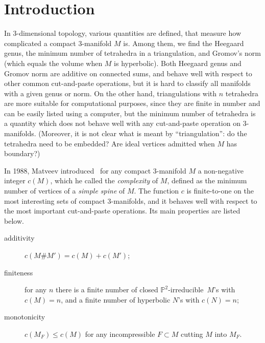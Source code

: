 \documentclass[10pt]{article}      %
\newcommand{\matP} {\ensuremath {\mathbb{P}}}
\newcommand{\ptwoirred}{$\matP^2$-irreducible}
\begin{document}
\renewcommand{\title}{Complexity of $3$-manifolds}
\renewcommand{\author}{Bruno Martelli\footnote{Supported by the INTAS project ``CalcoMet-GT'' 
03-51-3663}}

\dohead


\renewcommand{\firstpage}{\pageref{martelli_first}}  %
\renewcommand{\lastpage}{\pageref{martelli_last}}

\begin{abstract}
We give a summary of known results on Matveev's complexity of compact $3$-manifolds.
The only relevant new result is
the classification of all closed orientable irreducible $3$-manifolds
of complexity $10$.
\end{abstract}

\section{Introduction} \label{martelli_first}  
In 3-dimensional topology, various quantities are defined, that measure how complicated a 
compact 3-manifold $M$ is. 
Among them, we find the Heegaard genus, the minimum number of tetrahedra in a triangulation,
and Gromov's norm (which equals the volume when $M$ is hyperbolic).
Both Heegaard genus and Gromov norm are additive on connected sums, and behave well
with respect to other common cut-and-paste operations,
but it is hard to classify all manifolds with a given genus or norm.
On the other hand, triangulations with $n$ tetrahedra are more suitable for computational
purposes, since they are finite in number
and can be easily listed using a computer, 
but the minimum number of tetrahedra is
a quantity which does not behave well with any cut-and-paste operation on 3-manifolds.
(Moreover, it is not clear what is meant by ``triangulation'':
do the tetrahedra need to be embedded? Are ideal vertices admitted when $M$ has boundary?)

In 1988, Matveev introduced~\cite{Mat88} for any compact $3$-manifold $M$ a non-negative integer
$c(M)$, which he called the \emph{complexity} of $M$, defined as the minimum number
of vertices of a \emph{simple spine} of $M$. The function $c$ is finite-to-one on the
most interesting sets of compact 3-manifolds, and it behaves well with respect to the
most important cut-and-paste operations. Its main properties are listed below.
\begin{description}
\item[additivity] $c(M\#M')=c(M)+c(M')$;
\end{description}
\begin{description}
\item[finiteness] for any $n$ there is a finite number of closed \ptwoirred\ $M$'s
with $c(M)=n$, and a finite number of hyperbolic $N$'s with $c(N) = n$;
\end{description}
\begin{description}
\item[monotonicity] $c(M_F)\leqslant c(M)$ for any incompressible $F\subset M$ cutting $M$ into $M_F$.
\end{description}
\end{document}
